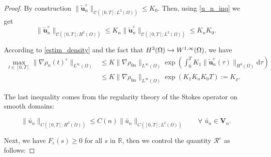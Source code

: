 \documentclass[11pt]{article}
\def\bq{\begin{equation}}
\def\eq{\end{equation}}
\def\bfV{\mathbf{V}}
\def\bfu{\mathbf{u}}
\def\md{\mathrm{d}}
\def\bq{\begin{equation}}
\def\eq{\end{equation}}
\def\Om{\Omega}
\begin{document}
\begin{proof}
{  By construction $\|\widetilde{\bfu}_n^{\varepsilon}\|_{\mathcal{C}([0,T];L^2(\Om))}\leq K_0$}. Then, using \eqref{u_n_inq} we get 
\bq
\|\widetilde{\bfu}_n^{\varepsilon}\|_{\mathcal{C}([0,T];H^2(\Omega))}\leq K_n \|\widetilde{\bfu}_n^{\varepsilon}\|_{\mathcal{C}([0,T];L^2(\Omega))} \leq K_n K_0.
\eq 

{According to \eqref{estim_density} and the fact that $H^3(\Omega) \xhookrightarrow{} W^{1,\infty}(\Omega)$, we have 
\bq
\begin{aligned}
\max_{t\in [0,T]} \|\nabla\rho_n(t)^{\varepsilon}\|_{L^{\infty}(\Omega)}&\leq K \|\nabla\rho_{0n}\|_{L^{\infty}(\Omega)}\operatorname{exp}\left(\int_0^T K_1 \|\widetilde{\bfu}_n^{\varepsilon}(\tau)\|_{H^3(\Omega)}\md \tau \right)\\
&\leq K \|\nabla\rho_{0n}\|_{L^{\infty}(\Omega)}\operatorname{exp}\left(K_1 K_n K_0 T \right):= K_{\rho}.
\end{aligned}
\eq}

The last inequality comes from the regularity theory of the Stokes operator on smooth domains:

\bq
\| \widetilde{u_n}\|_{C([0,T]; H^3(\Omega))}\leq C(n) \| \widetilde{u_n}\|_{C([0,T]; L^2(\Omega))} \qquad \forall\,\, \widetilde{u_n} \in \bfV_n .
\eq

Next, we have $F_{\varepsilon}(s) \geq 0$ for all $s$ in $\mathbb{R}$, then we control the quantity $\mathcal{R}^{\varepsilon}$ as follows:


\end{proof}
\end{document}
